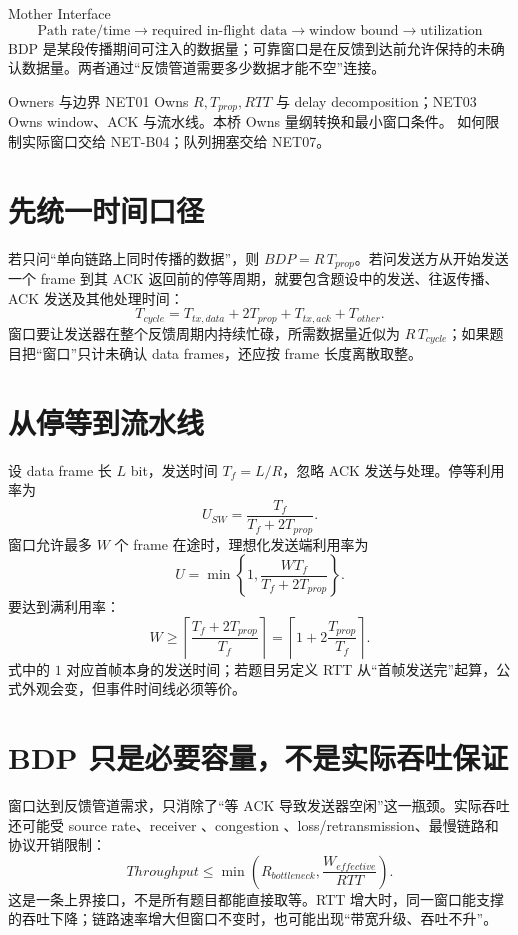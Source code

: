 \documentclass[UTF8,fontset=none,11pt,a4paper]{ctexart}
\begin{document}

\begin{corebox}{Mother Interface}
\[
\boxed{\text{Path rate/time}\to\text{required in-flight data}\to\text{window bound}\to\text{utilization}}
\]
BDP 是某段传播期间可注入的数据量；可靠窗口是在反馈到达前允许保持的未确认数据量。两者通过“反馈管道需要多少数据才能不空”连接。
\end{corebox}

\begin{methodbox}{Owners 与边界}
NET01 Owns $R,T_{prop},RTT$ 与 delay decomposition；NET03 Owns window、ACK 与流水线。本桥 Owns 量纲转换和最小窗口条件。 如何限制实际窗口交给 NET-B04；队列拥塞交给 NET07。
\end{methodbox}

\section{先统一时间口径}

若只问“单向链路上同时传播的数据”，则 $BDP=R\,T_{prop}$。若问发送方从开始发送一个 frame 到其 ACK 返回前的停等周期，就要包含题设中的发送、往返传播、ACK 发送及其他处理时间：
\[
T_{cycle}=T_{tx,data}+2T_{prop}+T_{tx,ack}+T_{other}.
\]
窗口要让发送器在整个反馈周期内持续忙碌，所需数据量近似为 $R\,T_{cycle}$；如果题目把“窗口”只计未确认 data frames，还应按 frame 长度离散取整。

\section{从停等到流水线}

设 data frame 长 $L$ bit，发送时间 $T_f=L/R$，忽略 ACK 发送与处理。停等利用率为
\[
U_{SW}=\frac{T_f}{T_f+2T_{prop}}.
\]
窗口允许最多 $W$ 个 frame 在途时，理想化发送端利用率为
\[
U=\min\left\{1,\frac{W T_f}{T_f+2T_{prop}}\right\}.
\]
要达到满利用率：
\[
W\ge\left\lceil\frac{T_f+2T_{prop}}{T_f}\right\rceil
=\left\lceil1+2\frac{T_{prop}}{T_f}\right\rceil.
\]
式中的 $1$ 对应首帧本身的发送时间；若题目另定义 RTT 从“首帧发送完”起算，公式外观会变，但事件时间线必须等价。

\section{BDP 只是必要容量，不是实际吞吐保证}

窗口达到反馈管道需求，只消除了“等 ACK 导致发送器空闲”这一瓶颈。实际吞吐还可能受 source rate、receiver 、congestion 、loss/retransmission、最慢链路和协议开销限制：
\[
Throughput\le\min\left(R_{bottleneck},\frac{W_{effective}}{RTT}\right).
\]
这是一条上界接口，不是所有题目都能直接取等。RTT 增大时，同一窗口能支撑的吞吐下降；链路速率增大但窗口不变时，也可能出现“带宽升级、吞吐不升”。
\end{document}
